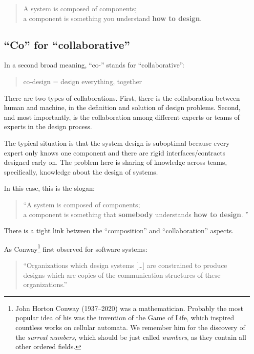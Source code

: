 \begin{quote}
	A system is composed of components;\\
	a component is something you understand
	\textbf{how to design}.
\end{quote}

\subsection{``Co'' for ``collaborative''}

In a second broad meaning, ``co-'' stands for ``collaborative'':

\begin{quote}
	co-design = design everything, together
\end{quote}

There are two types of collaborations.
First, there is the collaboration between human and machine, in the definition and solution of design problems.
Second, and most importantly, is the collaboration among different experts or teams of experts in the design process.

The typical situation is that the system design is suboptimal because every expert only knows one component and there are rigid interfaces/contracts designed early on.
The problem here is sharing of knowledge across teams, specifically, knowledge about the design of systems.

In this case, this is the slogan:

\begin{quote}
	\enquote{A system is composed of components;\\
		a component is something that \textbf{somebody} understands
		\textbf{how to design}.
	}
\end{quote}

There is a tight link between the ``composition'' and ``collaboration'' aspects.

As Conway\footnote{John Horton Conway (1937--2020) was a mathematician.
	Probably the most popular idea of his was the invention of the Game of Life, which inspired countless works on cellular automata.
	We remember him for the discovery of the \emph{surreal numbers}, which should be just called \emph{numbers}, as they contain all other ordered fields.
} first observed for software systems:

\begin{quote}
	\enquote{Organizations which design systems [\dots] are constrained to produce designs which are copies of the communication structures of these organizations.}
\end{quote}

